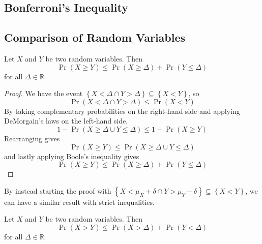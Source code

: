 \documentclass[11pt]{report} %
\begin{document}
\subsection{Bonferroni's Inequality}

\subsection{Comparison of Random Variables}

\begin{theorem}
Let $X$ and $Y$ be two random variables. Then
\begin{equation}
\operatorname{Pr}\left(X \geq Y\right) \leq \operatorname{Pr}\left(X \geq \Delta\right) + \operatorname{Pr}\left(Y \leq \Delta\right)
\end{equation}
for all $\Delta \in \mathbb{R}$.
\end{theorem}
\begin{proof}
We have the event $\left\{X < \Delta \cap Y > \Delta\right\} \subseteq \left\{X < Y\right\}$, so
\begin{equation}
\operatorname{Pr}\left(X < \Delta \cap Y > \Delta\right) \leq \operatorname{Pr}\left(X < Y\right)
\end{equation}
By taking complementary probabilities on the right-hand side and applying DeMorgain's laws on the left-hand side,
\begin{equation}
1 - \operatorname{Pr}\left(X \geq \Delta \cup Y \leq \Delta\right) \leq 1 - \operatorname{Pr}\left(X \geq Y\right)
\end{equation}
Rearranging gives
\begin{equation}
\operatorname{Pr}\left(X \geq Y\right) \leq \operatorname{Pr}\left(X \geq \Delta \cup Y \leq \Delta\right)
\end{equation}
and lastly applying Boole's inequality gives
\begin{equation}
\operatorname{Pr}\left(X \geq Y\right) \leq \operatorname{Pr}\left(X \geq \Delta\right) + \operatorname{Pr}\left(Y \leq \Delta\right)
\end{equation}
\end{proof}
By instead starting the proof with $\left\{X < \mu_{X} + \delta \cap Y > \mu_{Y} - \delta\right\} \subseteq \left\{X <  Y\right\}$, we can have a similar result with strict inequalities.
\begin{corollary}
Let $X$ and $Y$ be two random variables. Then
\begin{equation}
\operatorname{Pr}\left(X > Y\right) \leq \operatorname{Pr}\left(X > \Delta\right) + \operatorname{Pr}\left(Y < \Delta\right)
\end{equation}
for all $\Delta \in \mathbb{R}$.
\end{corollary}
\end{document}
